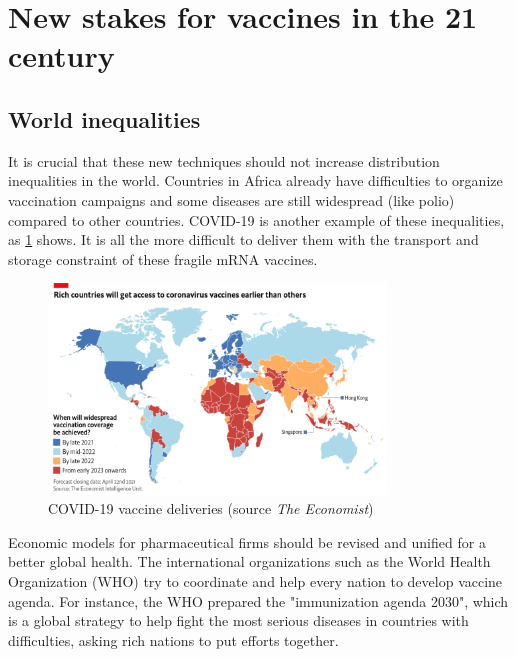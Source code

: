 \documentclass{article}
\begin{document}
    \section{New stakes for vaccines in the 21 century}

        \subsection{World inequalities}

            It is crucial that these new techniques should not increase distribution inequalities in the world.
            Countries in Africa already have difficulties to organize vaccination campaigns and some diseases are still widespread (like polio) compared to other countries.
            COVID-19 is another example of these inequalities, as \ref{fig:world_ineq} shows. It is all the more difficult to deliver them
                with the transport and storage constraint of these fragile mRNA vaccines.
            
                \begin{figure}
                    \centering
                    \includegraphics[width=0.8\textwidth]{imgs/Inequalities.png}
                    \caption{COVID-19 vaccine deliveries (source \emph{The Economist})}
                    \label{fig:world_ineq}
                \end{figure}

            Economic models for pharmaceutical firms should be revised and unified for a better global health.
            The international organizations such as the World Health Organization (WHO) try to coordinate and help every nation to develop vaccine agenda.
            For instance, the WHO prepared the "immunization agenda 2030", which is a global strategy to help fight the most serious diseases in countries with difficulties,
                asking rich nations to put efforts together.
\end{document}
